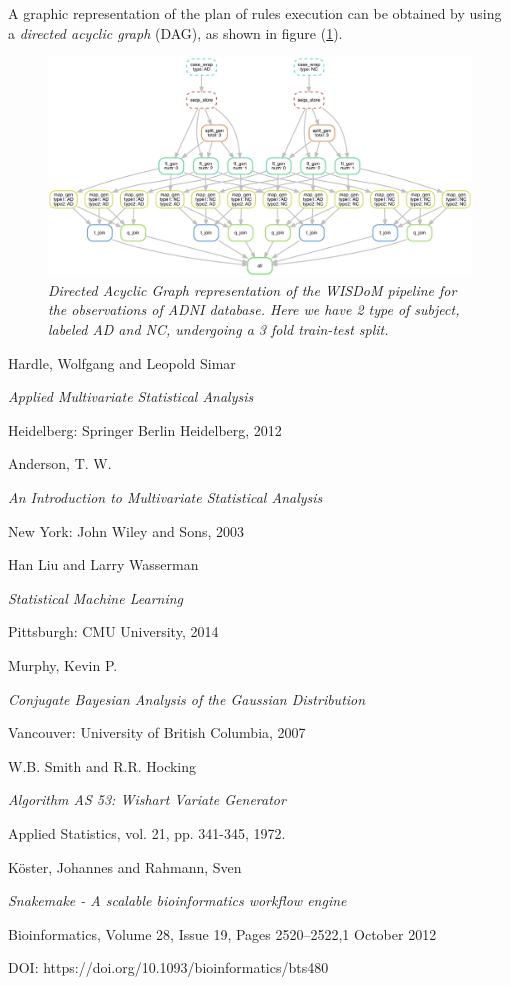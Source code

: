 \documentclass[12pt,openright,twoside,a4paper]{book}
\begin{document}
A graphic representation of the plan of rules execution can be obtained by using a \textit{directed acyclic graph} (DAG), as shown in figure (\ref{dag}).

\begin{figure}[!h]
\centering
\includegraphics[scale=0.53, angle=270]{dag}
\caption{\textit{Directed Acyclic Graph representation of the WISDoM pipeline for the observations of ADNI database. Here we have 2 type of subject, labeled AD and NC, undergoing a 3 fold train-test split.}}
\label{dag}
\end{figure}






\backmatter

\begin{thebibliography}{99}

Hardle, Wolfgang and Leopold Simar

\emph{Applied Multivariate Statistical Analysis}

Heidelberg: Springer Berlin Heidelberg, 2012

Anderson, T. W.

\emph{An Introduction to Multivariate Statistical Analysis}
 
New York: John Wiley and Sons,  2003

 Han Liu and Larry Wasserman
 
 \emph{Statistical Machine Learning}

 Pittsburgh: CMU University, 2014
 
Murphy, Kevin P.

\emph{Conjugate Bayesian Analysis of the Gaussian Distribution}

Vancouver: University of British Columbia, 2007
 
W.B. Smith and R.R. Hocking

\emph{Algorithm AS 53: Wishart Variate Generator}

Applied Statistics, vol. 21, pp. 341-345, 1972.

Köster, Johannes and Rahmann, Sven

\emph{Snakemake - A scalable bioinformatics workflow engine}

Bioinformatics, Volume 28, Issue 19, Pages 2520–2522,1 October 2012

DOI: https://doi.org/10.1093/bioinformatics/bts480


 \end{thebibliography}
 
  
 
\end{document}
